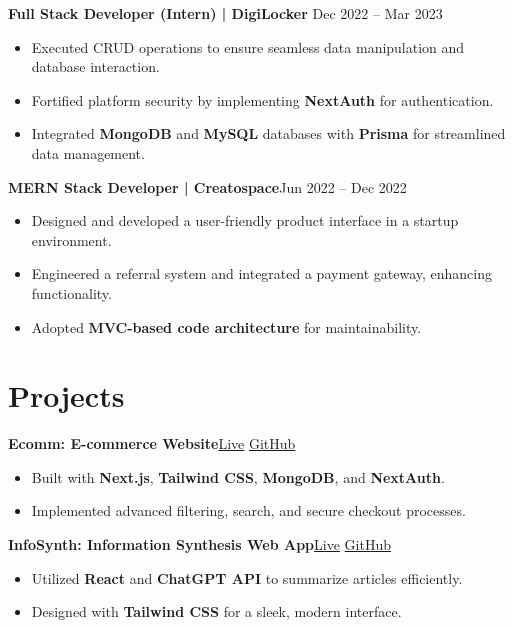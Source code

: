 \documentclass[a4paper,10pt]{article}
\newcommand{\entry}[2]{\textbf{#1}\hfill #2}
\begin{document}
\entry{Full Stack Developer (Intern) | DigiLocker}{ Dec 2022 -- Mar 2023}
\begin{itemize}[leftmargin=0.5cm]
    \item Executed CRUD operations to ensure seamless data manipulation and database interaction.
    \item Fortified platform security by implementing \textbf{NextAuth} for authentication.
    \item Integrated \textbf{MongoDB} and \textbf{MySQL} databases with \textbf{Prisma} for streamlined data management.
\end{itemize}

\entry{MERN Stack Developer | Creatospace}{Jun 2022 -- Dec 2022}
\begin{itemize}[leftmargin=0.5cm]
    \item Designed and developed a user-friendly product interface in a startup environment.
    \item Engineered a referral system and integrated a payment gateway, enhancing functionality.
    \item Adopted \textbf{MVC-based code architecture} for maintainability.
\end{itemize}
\vspace{2pt}

\section*{Projects}
\entry{Ecomm: E-commerce Website}{\href{https://ecomm-eight-pearl.vercel.app/}{Live} \textbullet{} \href{https://github.com/amanrathore48/Ecomm.}{GitHub}}
\begin{itemize}[leftmargin=0.5cm]
    \item Built with \textbf{Next.js}, \textbf{Tailwind CSS}, \textbf{MongoDB}, and \textbf{NextAuth}.
    \item Implemented advanced filtering, search, and secure checkout processes.
\end{itemize}

\entry{InfoSynth: Information Synthesis Web App}{\href{https://infosynthai.netlify.app/}{Live} \textbullet{} \href{https://github.com/amanrathore48/InfoSynth}{GitHub}}
\begin{itemize}[leftmargin=0.5cm]
    \item Utilized \textbf{React} and \textbf{ChatGPT API} to summarize articles efficiently.
    \item Designed with \textbf{Tailwind CSS} for a sleek, modern interface.
\end{itemize}
\end{document}
